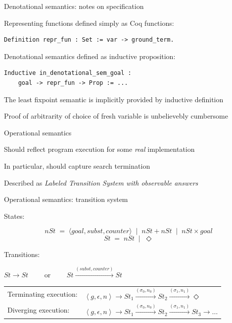 \documentclass{beamer}
\let\\\tabularnewline
\let\\\tabularnewline
\newcommand{\inbr}[1]{\left<{#1}\right>}
\theoremstyle{definition}
\theoremstyle{plain} %
\begin{document}
\begin{frame}[fragile]{Denotational semantics: notes on specification}

Representing functions defined simply as Coq functions:
\begin{lstlisting}
Definition repr_fun : Set := var -> ground_term.
\end{lstlisting}

\vskip5mm

Denotational semantics defined as inductive proposition:
\begin{lstlisting}
Inductive in_denotational_sem_goal :
    goal -> repr_fun -> Prop := ...
\end{lstlisting}

\vskip5mm

The least fixpoint semantic is implicitly provided by inductive definition

\vskip5mm

Proof of arbitrarity of choice of fresh variable is unbelievebly cumbersome

\end{frame}



\begin{frame}{Operational semantics}

Should reflect program execution for some \emph{real} implementation

\vskip3mm

In particular, should capture search termination

\vskip8mm

Described as \emph{Labeled Transition System with observable answers}

\end{frame}



\begin{frame}{Operational semantics: transition system}

States:

\[nSt \;=\; \langle goal, subst, counter \rangle \;\;|\;\; nSt + nSt \;\;|\;\; nSt \times goal \] 
\[St \;=\; nSt \;\;|\;\; \Diamond\]

\vskip5mm

Transitions:

\begin{center}
$St \xrightarrow{} St \qquad $ or $ \qquad St \xrightarrow{(subst, counter)} St$
\end{center}

\vskip8mm

\begin{tabular}{ll}
Terminating execution: & $\inbr{g, \epsilon, n} \xrightarrow{} St_1 \xrightarrow{(\sigma_0, n_0)} St_2 \xrightarrow{(\sigma_1, n_1)} \Diamond$ \\
Diverging execution: & $\inbr{g, \epsilon, n} \xrightarrow{} St_1 \xrightarrow{(\sigma_0, n_0)} St_2 \xrightarrow{(\sigma_1, n_1)} St_3 \xrightarrow{} \dots$ \\
\end{tabular}

\end{frame}
\end{document}
